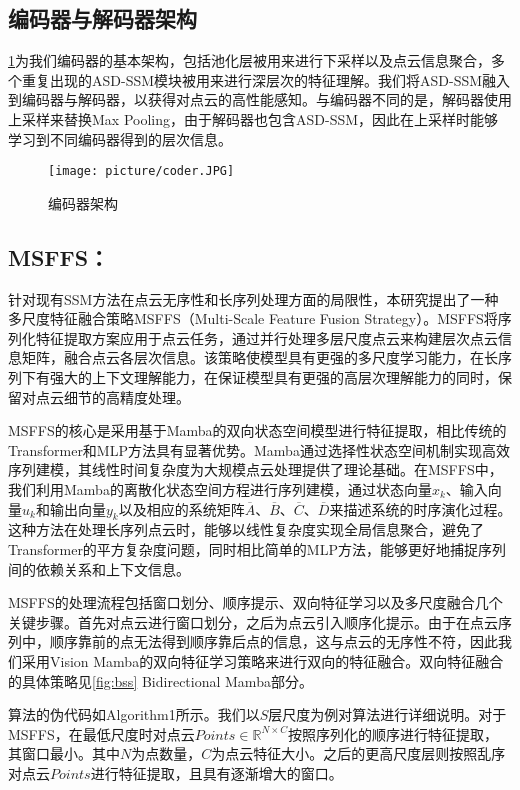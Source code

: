 \documentclass[preprint,12pt]{elsarticle}
\begin{document}
\subsection{编码器与解码器架构}
\cref{fig:coder}为我们编码器的基本架构，包括池化层被用来进行下采样以及点云信息聚合，多个重复出现的ASD-SSM模块被用来进行深层次的特征理解。我们将ASD-SSM融入到编码器与解码器，以获得对点云的高性能感知。与编码器不同的是，解码器使用上采样来替换Max Pooling，由于解码器也包含ASD-SSM，因此在上采样时能够学习到不同编码器得到的层次信息。

\begin{figure}[htbp]
	\centering
	\texttt{[image: picture/coder.JPG]}
	\caption{编码器架构}
	\label{fig:coder}
\end{figure}

\subsection{MSFFS：}
针对现有SSM方法在点云无序性和长序列处理方面的局限性，本研究提出了一种多尺度特征融合策略MSFFS（Multi-Scale Feature Fusion Strategy）。MSFFS将序列化特征提取方案应用于点云任务，通过并行处理多层尺度点云来构建层次点云信息矩阵，融合点云各层次信息。该策略使模型具有更强的多尺度学习能力，在长序列下有强大的上下文理解能力，在保证模型具有更强的高层次理解能力的同时，保留对点云细节的高精度处理。

MSFFS的核心是采用基于Mamba的双向状态空间模型进行特征提取，相比传统的Transformer和MLP方法具有显著优势。Mamba通过选择性状态空间机制实现高效序列建模，其线性时间复杂度为大规模点云处理提供了理论基础。在MSFFS中，我们利用Mamba的离散化状态空间方程进行序列建模，通过状态向量$x_k$、输入向量$u_k$和输出向量$y_k$以及相应的系统矩阵$\overline{A}$、$\overline{B}$、$\overline{C}$、$\overline{D}$来描述系统的时序演化过程。这种方法在处理长序列点云时，能够以线性复杂度实现全局信息聚合，避免了Transformer的平方复杂度问题，同时相比简单的MLP方法，能够更好地捕捉序列间的依赖关系和上下文信息。

MSFFS的处理流程包括窗口划分、顺序提示、双向特征学习以及多尺度融合几个关键步骤。首先对点云进行窗口划分，之后为点云引入顺序化提示。由于在点云序列中，顺序靠前的点无法得到顺序靠后点的信息，这与点云的无序性不符，因此我们采用Vision Mamba\cite{VisionMamba}的双向特征学习策略来进行双向的特征融合。双向特征融合的具体策略见\cref{fig:bss} Bidirectional Mamba部分。

算法的伪代码如Algorithm1所示。我们以$S$层尺度为例对算法进行详细说明。对于MSFFS，在最低尺度时对点云$Points\in\mathbb{R}^{N\times{C}}$按照序列化的顺序进行特征提取，其窗口最小。其中$N$为点数量，$C$为点云特征大小。之后的更高尺度层则按照乱序对点云$Points$进行特征提取，且具有逐渐增大的窗口。
\end{document}
